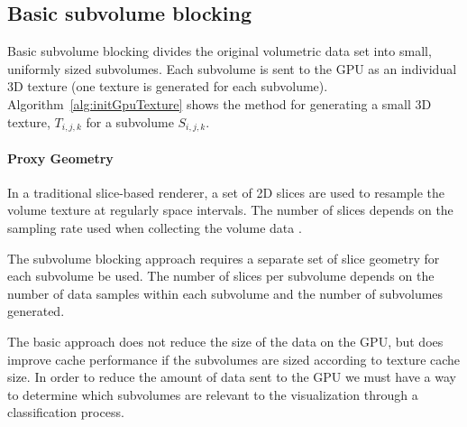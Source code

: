 \documentclass[journal]{vgtc}                %
\begin{document}

\subsection{Basic subvolume blocking}\label{sec:basicSubvolumeBlocking}

Basic subvolume blocking divides the original volumetric data set into small,
uniformly sized subvolumes. Each subvolume is sent to the GPU
as an individual 3D texture (one texture is generated for each subvolume). 
Algorithm~\ref{alg:initGpuTexture}
shows the method for generating a small 3D texture, $T_{i,j,k}$ for a subvolume
$S_{i,j,k}$.

\paragraph{Proxy Geometry}
In a traditional slice-based renderer, a set of 2D slices are used to resample the volume
texture at regularly space intervals. The number of slices depends on the sampling
rate used when collecting the volume data \cite{Engel2004}. 

The subvolume blocking approach requires a separate set of slice geometry for each 
subvolume be used. The number of slices per subvolume depends on the number of 
data samples within each subvolume and the number of subvolumes generated.

The basic approach does not reduce the size of the data on the GPU, but does
improve cache performance if the subvolumes are sized according to texture
cache size. In order to reduce the amount of data sent to the GPU we must have 
a way to determine which subvolumes are relevant to the visualization through
a classification process.
\end{document}
